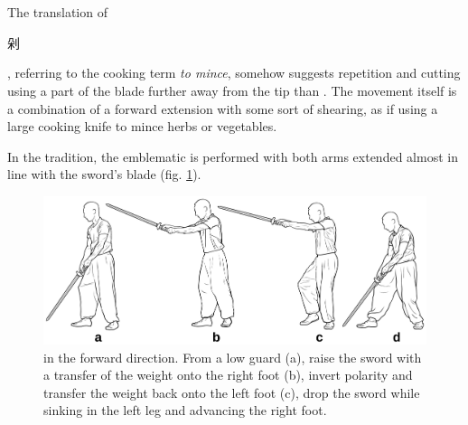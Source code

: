 \section{\Duo}
The translation of \Duo{} \begin{CJK*}{UTF8}{bsmi}剁\end{CJK*}, referring to the cooking term \textit{to mince}, somehow suggests repetition and cutting using a part of the blade further away from the tip than \Pi{}. The movement itself is a combination of a forward extension with some sort of shearing, as if using a large cooking knife to mince herbs or vegetables.

In the \Yangjia{} \Michuan{} tradition, the emblematic \Duo{} is performed with both arms extended almost in line with the sword's blade (fig. \ref{fig:duo_full}). 


\begin{figure}[ht]
	\centering
	
	\includegraphics[width=1.00\textwidth]{../../Images/JibenJianfa/Duo/Duo.pdf}
	\caption[Advancing \Duo{}]{\Duo{} in the forward direction. From a low guard (a), raise the sword with a transfer of the weight onto the right foot (b), invert polarity and transfer the weight back onto the left foot (c), drop the sword while sinking in the left leg and advancing the right foot.}
	\label{fig:duo_full}
\end{figure} 

